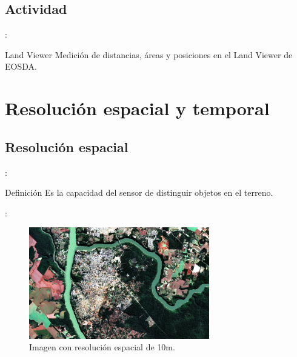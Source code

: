 \documentclass[aspectratio=169]{beamer}
\begin{document}
\subsection{Actividad}

\begin{frame}{\secname : \subsecname}
    \begin{alertblock}{Land Viewer}
        Medición de distancias, áreas y posiciones en el Land Viewer de EOSDA.
    \end{alertblock}
\end{frame}


\section{Resolución espacial y temporal}
\subsection{Resolución espacial}
\begin{frame}{\secname : \subsecname}
    \begin{block}{Definición}
        Es la capacidad del sensor de distinguir objetos en el terreno.
    \end{block}
\end{frame}

\begin{frame}{\secname : \subsecname}
    \begin{figure}[h!]
        \centering
        \includegraphics[width=0.7\textwidth]{fig:10m.jpg}
        \caption{Imagen con resolución espacial de 10m.}
    \end{figure}
\end{frame}
\end{document}
